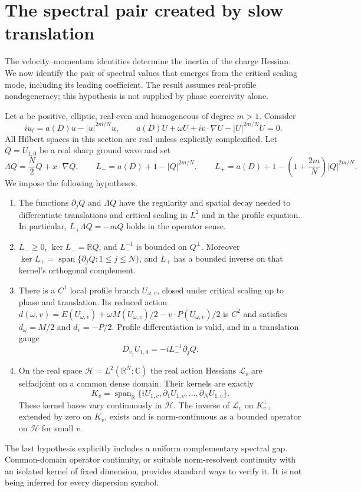 \section{The spectral pair created by slow translation}
\label{sec:r11-spectral}

The velocity--momentum identities determine the inertia of the charge Hessian. We now identify the pair of spectral values that emerges
from the critical scaling mode, including its leading coefficient. The
result assumes real-profile nondegeneracy; this hypothesis is not supplied
by phase coercivity alone.

Let $a$ be positive, elliptic, real-even and homogeneous of degree $m>1$.
Consider
\[
 iu_t=a(D)u-|u|^{2m/N}u,
 \qquad
 a(D)U+\omega U+iv\cdot\nabla U-|U|^{2m/N}U=0.
\]
All Hilbert spaces in this section are real unless explicitly complexified.
Let $Q=U_{1,0}$ be a real sharp ground wave and set
\[
 \Lambda Q=\frac N2Q+x\cdot\nabla Q,\qquad
 L_-=a(D)+1-|Q|^{2m/N},\qquad
 L_+=a(D)+1-\left(1+\frac{2m}{N}\right)|Q|^{2m/N}.
\]
We impose the following hypotheses.
\begin{enumerate}
\item The functions $\partial_jQ$ and $\Lambda Q$ have the regularity and
spatial decay needed to differentiate translations and critical scaling
in $L^2$ and in the profile equation. In particular,
$L_+\Lambda Q=-mQ$ holds in the operator sense.
\item $L_-\geq0$, $\ker L_-=\mathbb RQ$, and $L_-^{-1}$ is bounded
on $Q^\perp$. Moreover
$\ker L_+=\operatorname{span}\{\partial_jQ:1\leq j\leq N\}$,
and $L_+$ has a bounded inverse on that kernel's orthogonal complement.
\item There is a $C^1$ local profile branch $U_{\omega,v}$, closed under
critical scaling up to phase and translation. Its reduced action
$d(\omega,v)=E(U_{\omega,v})+\omega M(U_{\omega,v})/2
-v\cdot P(U_{\omega,v})/2$ is $C^2$ and satisfies
$d_\omega=M/2$ and $d_v=-P/2$. Profile differentiation is valid, and in
a translation gauge
\[
 D_{v_j}U_{1,0}=-iL_-^{-1}\partial_jQ.
\]
\item On the real space $\mathcal H=L^2(\mathbb R^N;\mathbb C)$ the
real action Hessians $\mathcal L_v$ are selfadjoint on a common dense
domain. Their kernels are exactly
\[
 K_v=\operatorname{span}_{\mathbb R}
       \{iU_{1,v},\partial_1U_{1,v},\ldots,\partial_NU_{1,v}\}.
\]
These kernel bases vary continuously in $\mathcal H$. The inverse of
$\mathcal L_v$ on $K_v^\perp$, extended by zero on $K_v$, exists and is
norm-continuous as a bounded operator on $\mathcal H$ for small $v$.
\end{enumerate}
The last hypothesis explicitly includes a uniform complementary spectral
gap. Common-domain operator continuity, or suitable norm-resolvent
continuity with an isolated kernel of fixed dimension, provides standard
ways to verify it. It is not being inferred for every dispersion symbol.

